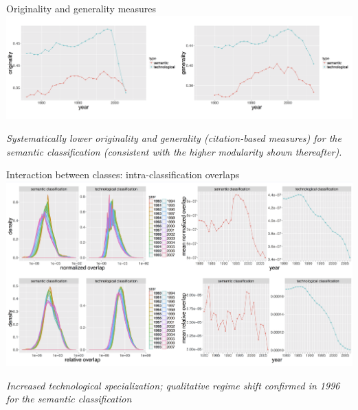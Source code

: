 \documentclass{beamer}
\begin{document}
\begin{frame}{Originality and generality measures}
    \centering
    \includegraphics[width=\textwidth]{figures/Fig6.png}
    
    \medskip
    
    \textit{Systematically lower originality and generality (citation-based measures) for the semantic classification (consistent with the higher modularity shown thereafter).}
    
\end{frame}

\begin{frame}{Interaction between classes: intra-classification overlaps}
   \centering
    \includegraphics[width=\textwidth]{figures/Fig7.png}
    
    \medskip

    
    \textit{Increased technological specialization; qualitative regime shift confirmed in 1996 for the semantic classification}
    
    
\end{frame}
\end{document}
